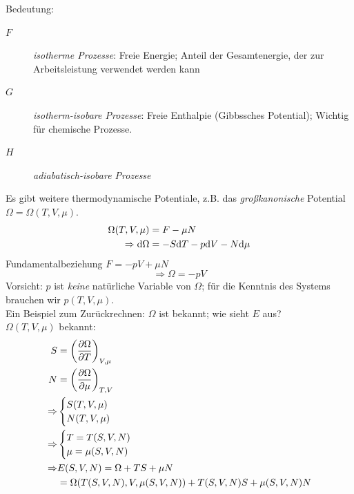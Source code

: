 Bedeutung:
\begin{description}
    \item[$F$] \emph{isotherme Prozesse}: Freie Energie; Anteil der Gesamtenergie, der zur Arbeitsleistung verwendet werden kann
    \item[$G$] \emph{isotherm-isobare Prozesse}: Freie Enthalpie (Gibbssches Potential); Wichtig für chemische Prozesse.
    \item[$H$] \emph{adiabatisch-isobare Prozesse}
\end{description}
Es gibt weitere thermodynamische Potentiale, z.B. das \emph{großkanonische} Potential $\Omega = \Omega(T, V, \mu)$.
\begin{equation}
    \begin{split}
        \Omega(T, V, \mu) &= F - \mu N \\
        \Rightarrow \mathrm{d} \Omega &= - S \mathrm{d} T - p \mathrm{d} V - N \mathrm{d} \mu
    \end{split}
\end{equation}
Fundamentalbeziehung $F=-pV + \mu N$
\begin{equation}
    \Rightarrow \Omega = - p V
\end{equation}
Vorsicht: $p$ ist \emph{keine} natürliche Variable von $\Omega$; für die Kenntnis des Systems brauchen wir $p(T, V, \mu)$.\\[\baselineskip]
Ein Beispiel zum Zurückrechnen: $\Omega$ ist bekannt; wie sieht $E$ aus? \\
$\Omega(T, V, \mu)$ bekannt:
\begin{equation}
    \begin{split}
        S &= \left( \frac{\partial \Omega}{\partial T} \right)_{V, \mu} \\
        N &= \left( \frac{\partial \Omega}{\partial \mu} \right)_{T, V} \\
        \Rightarrow &
        \begin{cases}
            S(T, V, \mu) \\
            N(T, V, \mu)
        \end{cases} \\
        \Rightarrow &
        \begin{cases}
            T = T(S, V, N) \\
            \mu = \mu(S, V, N)
        \end{cases} \\
        \Rightarrow & E(S, V, N) = \Omega + TS + \mu N \\
        &= \Omega(T(S, V, N), V, \mu(S, V, N)) + T(S, V, N) S + \mu (S, V, N) N
    \end{split}
\end{equation}
